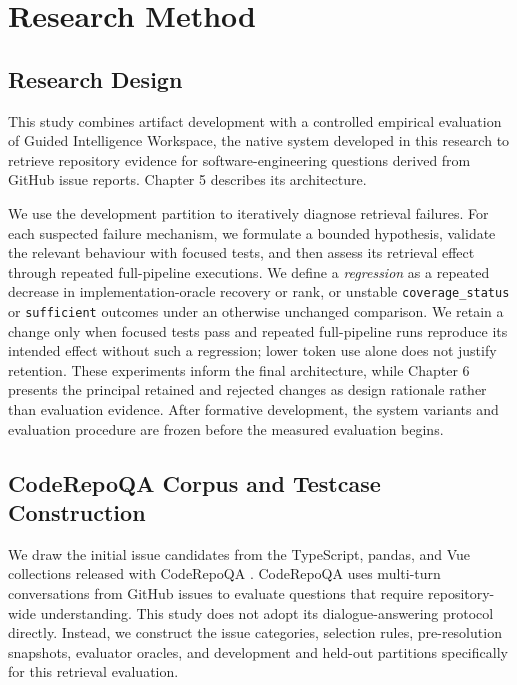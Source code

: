 \chapter{Research Method}\label{ch:research-method}

\section{Research Design}\label{sec:research-design}

This study combines artifact development with a controlled empirical evaluation of Guided Intelligence Workspace, the native system developed in this research to retrieve repository evidence for software-engineering questions derived from GitHub issue reports. Chapter 5 describes its architecture.

We use the development partition to iteratively diagnose retrieval failures. For each suspected failure mechanism, we formulate a bounded hypothesis, validate the relevant behaviour with focused tests, and then assess its retrieval effect through repeated full-pipeline executions. We define a \emph{regression} as a repeated decrease in implementation-oracle recovery or rank, or unstable \texttt{coverage\_status} or \texttt{sufficient} outcomes under an otherwise unchanged comparison. We retain a change only when focused tests pass and repeated full-pipeline runs reproduce its intended effect without such a regression; lower token use alone does not justify retention. These experiments inform the final architecture, while Chapter 6 presents the principal retained and rejected changes as design rationale rather than evaluation evidence. After formative development, the system variants and evaluation procedure are frozen before the measured evaluation begins.

\section{CodeRepoQA Corpus and Testcase Construction}\label{sec:coderepoqa-corpus-and-testcase-construction}

We draw the initial issue candidates from the TypeScript, pandas, and Vue collections released with CodeRepoQA \textcite{Hu2025CodeRepoQA}. CodeRepoQA uses multi-turn conversations from GitHub issues to evaluate questions that require repository-wide understanding. This study does not adopt its dialogue-answering protocol directly. Instead, we construct the issue categories, selection rules, pre-resolution snapshots, evaluator oracles, and development and held-out partitions specifically for this retrieval evaluation.


